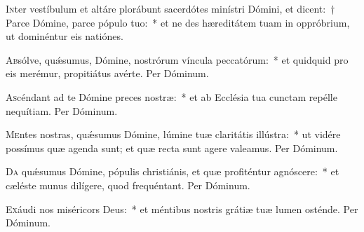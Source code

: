 \documentclass[vesperale_romanum.tex]{subfiles}
\begin{document}

\lettrine{I}{n}ter vestíbulum et altáre plorábunt sacerdótes minístri Dómini, et dicent:~† Parce Dómine, parce pópulo tuo:~* et ne des hæreditátem tuam in oppróbrium, ut dominéntur eis natiónes.





\oratio

\lettrine{A}{b}sólve, quǽsumus, Dómine, nostrórum víncula peccatórum:~* et quidquid pro eis merémur, propitiátus avérte.
Per Dóminum.




\oratio

\lettrine{A}{s}céndant ad te Dómine preces nostræ:~* et ab Ecclésia tua cunctam repélle nequítiam. Per Dóminum.



\oratio

\lettrine{M}{e}ntes nostras, quǽsumus Dómine, lúmine tuæ claritátis illústra:~* ut vidére possímus quæ agenda sunt; et quæ recta sunt agere valeamus. Per Dóminum.



\oratio

\lettrine{D}{a} quǽsumus Dómine, pópulis christiánis, et quæ profiténtur agnóscere:~* et cæléste munus dilígere, quod frequéntant. Per Dóminum.



\oratio

\lettrine{E}{x}áudi nos miséricors Deus:~* et méntibus nostris grátiæ tuæ lumen osténde. Per Dóminum.
\end{document}
